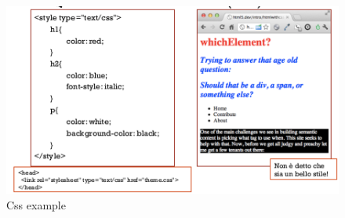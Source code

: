 \documentclass[a4paper,12pt, oneside]{book}
\begin{document}
\begin{figure}
    \caption{Css example}
    \label{css:example}
	\includegraphics[scale=0.9]{img/css.png}
\end{figure}
\end{document}
